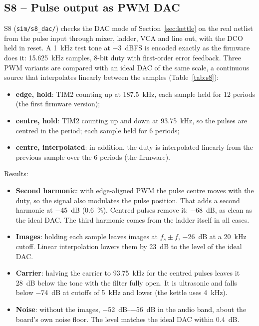 \documentclass[11pt,a4paper]{article}
\newcommand{\file}[1]{\texttt{#1}}
\begin{document}
\subsection{S8 -- Pulse output as PWM DAC}\label{sec:s8}
S8 (\file{sim/s8\_dac/}) checks the DAC mode of Section~\ref{sec:kettle} on the real netlist from the pulse
input through mixer, ladder, VCA and line out, with the DCO held in reset. A \SI{1}{kHz} test tone at
\SI{-3}{dBFS} is encoded exactly as the firmware does it: \SI{15.625}{kHz} samples, 8-bit duty with
first-order error feedback. Three PWM variants are compared with an ideal DAC of the same scale, a continuous
source that interpolates linearly between the samples (Table~\ref{tab:s8}):
\begin{itemize}
  \item \textbf{edge, hold}: TIM2 counting up at \SI{187.5}{kHz}, each sample held for 12 periods (the first
    firmware version);
  \item \textbf{centre, hold}: TIM2 counting up and down at \SI{93.75}{kHz}, so the pulses are centred in
    the period; each sample held for 6 periods;
  \item \textbf{centre, interpolated}: in addition, the duty is interpolated linearly from the previous
    sample over the 6 periods (the firmware).
\end{itemize}
Results:
\begin{itemize}
  \item \textbf{Second harmonic}: with edge-aligned PWM the pulse centre moves with the duty, so the signal
    also modulates the pulse position. That adds a second harmonic at \SI{-45}{dB} (\SI{0.6}{\percent}).
    Centred pulses remove it: \SI{-68}{dB}, as clean as the ideal DAC. The third harmonic comes from the ladder
    itself in all cases.
  \item \textbf{Images}: holding each sample leaves images at $f_s \pm f$, \SI{-26}{dB} at a \SI{20}{kHz}
    cutoff. Linear interpolation lowers them by \SI{23}{dB} to the level of the ideal DAC.
  \item \textbf{Carrier}: halving the carrier to \SI{93.75}{kHz} for the centred pulses leaves it
    \SI{28}{dB} below the tone with the filter fully open. It is ultrasonic and falls below \SI{-74}{dB} at
    cutoffs of \SI{5}{kHz} and lower (the kettle uses \SI{4}{kHz}).
  \item \textbf{Noise}: without the images, \SIrange{-52}{-56}{dB} in the audio band, about the board's own
    noise floor. The level matches the ideal DAC within \SI{0.4}{dB}.
\end{itemize}
\end{document}
